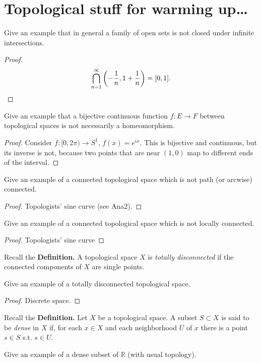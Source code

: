 \section*{Topological stuff for warming up\ldots}

\begin{Problem}
	Give an example that in general a family of open sets is not closed under infinite intersections.
\end{Problem}
\begin{proof}
	\[\bigcap_{n=1}^\infty \left(-\frac 1n, 1 + \frac 1n\right)=[0,1].\qedhere\]
\end{proof}
\begin{Problem}
	Give an example that a bijective continuous function $f : E \to F$ between topological spaces is not necessarily a homeomorphism.
\end{Problem}
\begin{proof}
	Consider $f:[0,2\pi)\to S^1$, $f(x) = e^{ix}$. This is bijective and continuous, but its inverse is not, because two points that are near $(1,0)$ map to different ends of the interval.
\end{proof}
\begin{Problem}
	Give an example of a connected topological space which is not path (or arcwise) connected.
\end{Problem}
\begin{proof}
	Topologists' sine curve (see Ana2).
\end{proof}
\begin{Problem}
	Give an example of a connected topological space which is not locally connected.
\end{Problem}
\begin{proof}
	Topologists' sine curve
\end{proof}
\begin{Problem}
	Recall the 
	\textbf{Definition.} A topological space $X$ is \textit{totally disconnected} if the connected components of $X$ are single points.
	
	Give an example of a totally disconnected topological space.
\end{Problem}
\begin{proof}
	Discrete space.
\end{proof}
\begin{Problem}
	Recall the \textbf{Definition.} Let $X$ be a topological space. A subset $S \subset X$ is said to be \textit{dense} in $X$ if, for each $x \in X$ and each neighborhood $U$ of $x$ there is a point $s \in S$ s.t. $s \in U$.
	
	Give an example of a dense subset of $\mathbb{R}$ (with usual topology).
\end{Problem}
